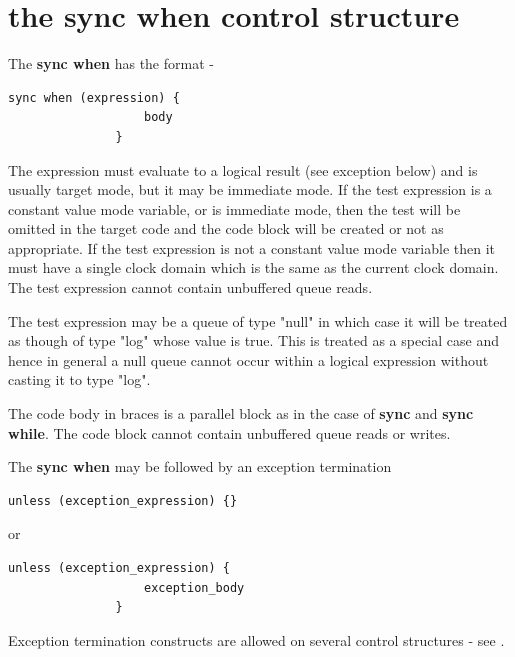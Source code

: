     \section{the {\bf sync when} control structure}\label{sec:sync_when_struct}
    
        The {\bf sync when} has the format -
        \begin{lstlisting}[gobble=8, language=threepl]
               sync when (expression) {
                   body
               }
        \end{lstlisting}

        The expression must evaluate to a logical result (see exception below)
        and is usually target mode, but it may be immediate mode. If the test
        expression is a constant value mode variable, or is immediate mode, then
        the test will be omitted in the target code and the code block will be
        created or not as appropriate. If the test expression is not a constant
        value mode variable then it must have a single clock domain which is the
        same as the current clock domain. The test expression cannot contain
        unbuffered queue reads.

        The test expression may be a queue of type "null" in which case it will
        be treated as though of type "log" whose value is true. This is treated
        as a special case and hence in general a null queue cannot occur within
        a logical expression without casting it to type "log".

        The code body in braces is a parallel block as in the case of {\bf sync}
        and {\bf sync while}. The code block cannot contain unbuffered queue
        reads or writes.
        
        The {\bf sync when} may be followed by an
        exception termination
        \begin{lstlisting}[gobble=8, language=threepl]
               unless (exception_expression) {}
        \end{lstlisting}
        or
        \begin{lstlisting}[gobble=8, language=threepl]
               unless (exception_expression) {
                   exception_body
               }
        \end{lstlisting}
        
        Exception termination constructs are allowed on several control structures
        - see .
        
